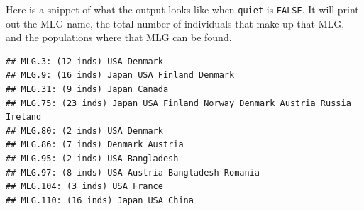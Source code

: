 \documentclass[letterpaper]{article}\usepackage[]{graphicx}\usepackage[]{color}
\makeatletter
\newenvironment{kframe}{%
 \def\at@end@of@kframe{}%
 \ifinner\ifhmode%
  \def\at@end@of@kframe{\end{minipage}}%
  \begin{minipage}{\columnwidth}%
 \fi\fi%
 \def\FrameCommand##1{\hskip\@totalleftmargin \hskip-\fboxsep
 \colorbox{shadecolor}{##1}\hskip-\fboxsep
     \hskip-\linewidth \hskip-\@totalleftmargin \hskip\columnwidth}%
 \MakeFramed {\advance\hsize-\width
   \@totalleftmargin\z@ \linewidth\hsize
   \@setminipage}}%
 {\par\unskip\endMakeFramed%
 \at@end@of@kframe}
\newenvironment{knitrout}{}{} %
\makeatother
\begin{document}
Here is a snippet of what the output looks like when \texttt{quiet} is \texttt{FALSE}. It will print out the MLG name, the total number of individuals that make up that MLG, and the populations where that MLG can be found.
\begin{knitrout}\footnotesize
{}\color{fgcolor}\begin{kframe}
\begin{verbatim}
## MLG.3: (12 inds) USA Denmark 
## MLG.9: (16 inds) Japan USA Finland Denmark 
## MLG.31: (9 inds) Japan Canada 
## MLG.75: (23 inds) Japan USA Finland Norway Denmark Austria Russia Ireland 
## MLG.80: (2 inds) USA Denmark 
## MLG.86: (7 inds) Denmark Austria 
## MLG.95: (2 inds) USA Bangladesh 
## MLG.97: (8 inds) USA Austria Bangladesh Romania 
## MLG.104: (3 inds) USA France 
## MLG.110: (16 inds) Japan USA China
\end{verbatim}
\end{kframe}
\end{knitrout}
\end{document}
